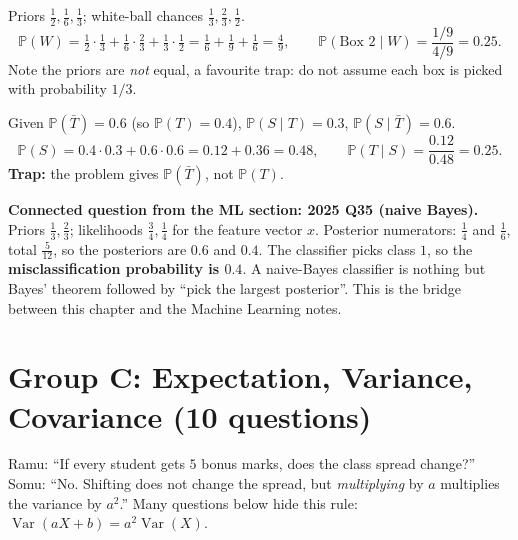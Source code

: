 \documentclass[11pt,a4paper]{article}
\newcommand{\Var}{\operatorname{Var}}
\renewcommand{\Pr}{\mathbb{P}}
\begin{document}
\begin{example}
Priors $\tfrac12,\tfrac16,\tfrac13$; white-ball chances $\tfrac13,\tfrac23,\tfrac12$.
\[\Pr(W)=\tfrac12\cdot\tfrac13+\tfrac16\cdot\tfrac23+\tfrac13\cdot\tfrac12=\tfrac16+\tfrac19+\tfrac16=\tfrac49,\qquad\Pr(\text{Box 2}\mid W)=\frac{1/9}{4/9}=\mathbf{0.25}.\]
Note the priors are \emph{not} equal, a favourite trap: do not assume each box is picked with probability $1/3$.
\end{example}

\begin{example}
Given $\Pr(\bar T)=0.6$ (so $\Pr(T)=0.4$), $\Pr(S\mid T)=0.3$, $\Pr(S\mid\bar T)=0.6$.
\[\Pr(S)=0.4\cdot0.3+0.6\cdot0.6=0.12+0.36=0.48,\qquad \Pr(T\mid S)=\frac{0.12}{0.48}=\mathbf{0.25}.\]
\textbf{Trap:} the problem gives $\Pr(\bar T)$, not $\Pr(T)$.
\end{example}

\begin{intuition}
\textbf{Connected question from the ML section: 2025 Q35 (naive Bayes).}
Priors $\tfrac13,\tfrac23$; likelihoods $\tfrac34,\tfrac14$ for the feature vector $x$. Posterior numerators: $\tfrac14$ and $\tfrac16$, total $\tfrac5{12}$, so the posteriors are $0.6$ and $0.4$. The classifier picks class $1$, so the \textbf{misclassification probability is $0.4$}. A naive-Bayes classifier is nothing but Bayes' theorem followed by ``pick the largest posterior''. This is the bridge between this chapter and the Machine Learning notes.
\end{intuition}

\section{Group C: Expectation, Variance, Covariance (10 questions)}

\begin{story}
Ramu: ``If every student gets $5$ bonus marks, does the class spread change?'' Somu: ``No. Shifting does not change the spread, but \emph{multiplying} by $a$ multiplies the variance by $a^2$.'' Many questions below hide this rule: $\Var(aX+b)=a^2\Var(X)$.
\end{story}
\end{document}
